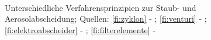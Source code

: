 \begin{figure}[ht!]
\begin{center}
{       }%
       \\%
%
   \end{center}
   \caption{%
       Unterschiedliche Verfahrensprinzipien zur Staub- und Aerosolabscheidung; Quellen: \ref{fi:zyklon} - \cite{zyklon}; \ref{fi:venturi} - \cite{venturi}; \ref{fi:elektroabscheider} - \cite{immission}; \ref{fi:filterelemente} - \cite{filterelemente}
    }%
  \label{fig:verfahren}
\end{figure}
\newpage
